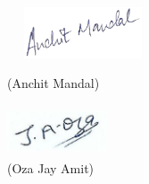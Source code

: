 \vspace{0.5in}

\begin{figure}[H]
\centering
\begin{minipage}{.3\textwidth}
    \centering        
    \includegraphics[height=1.5cm, width=4.5cm]{img/anchit.png}
    \caption*{(Anchit Mandal)}
    \label{fig:anchit_sign}
\end{minipage}
\begin{minipage}{.3\textwidth}
    \centering        
    \includegraphics[height=1.5cm, width=3cm]{img/jay.jpg}
    \caption*{(Oza Jay Amit)}
    \label{fig:oza_jay}
\end{minipage}
\end{figure}

\setlength\parindent{0pt}